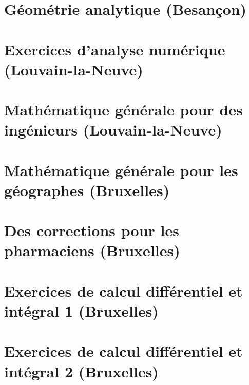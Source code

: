 
\chapter{Géométrie analytique (Besançon)}


\chapter{Exercices d'analyse numérique (Louvain-la-Neuve)}



\chapter{Mathématique générale pour des ingénieurs (Louvain-la-Neuve)}



\chapter{Mathématique générale pour les géographes (Bruxelles)}



\chapter{Des corrections pour les pharmaciens (Bruxelles)}


%


\chapter{Exercices de calcul différentiel et intégral 1 (Bruxelles)}









 
\chapter{Exercices de calcul différentiel et intégral 2 (Bruxelles)}





